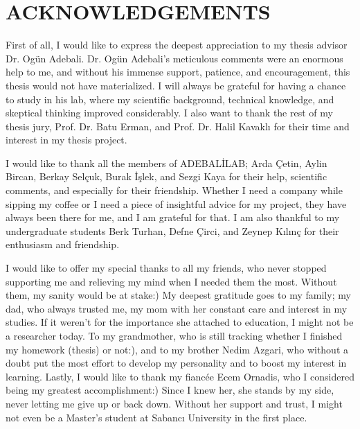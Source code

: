 \setlength{\parindent}{0pt}
\chapter*{\vspace{-4\baselineskip} \bf ACKNOWLEDGEMENTS}

First of all, I would like to express the deepest appreciation to my thesis advisor Dr. Ogün Adebali. Dr. Ogün Adebali's meticulous comments were an enormous help to me, and without his immense support, patience, and encouragement, this thesis would not have materialized. I will always be grateful for having a chance to study in his lab, where my scientific background, technical knowledge, and skeptical thinking improved considerably. I also want to thank the rest of my thesis jury, Prof. Dr. Batu Erman, and Prof. Dr. Halil Kavaklı for their time and interest in my thesis project. 

I would like to thank all the members of ADEBALİLAB; Arda Çetin, Aylin Bircan, Berkay Selçuk, Burak İşlek, and Sezgi Kaya for their help, scientific comments, and especially for their friendship. Whether I need a company while sipping my coffee or I need a piece of insightful advice for my project, they have always been there for me, and I am grateful for that. I am also thankful to my undergraduate students Berk Turhan, Defne Çirci, and Zeynep Kılınç for their enthusiasm and friendship.

I would like to offer my special thanks to all my friends, who never stopped supporting me and relieving my mind when I needed them the most. Without them, my sanity would be at stake:) My deepest gratitude goes to my family; my dad, who always trusted me, my mom with her constant care and interest in my studies. If it weren't for the importance she attached to education, I might not be a researcher today. To my grandmother, who is still tracking whether I finished my homework (thesis) or not:), and to my brother Nedim Azgari, who without a doubt put the most effort to develop my personality and to boost my interest in learning. Lastly, I would like to thank my fiancée Ecem Ornadis, who I considered being my greatest accomplishment:) Since I knew her, she stands by my side, never letting me give up or back down. Without her support and trust, I might not even be a Master's student at Sabancı University in the first place.    

\clearpage\pagebreak